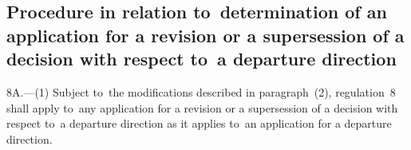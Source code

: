 \documentclass[12pt,a4paper]{article}
\begin{document}


\subsection[8A. Procedure in relation to~determination of an application for a revision or a supersession of a decision with respect to~a departure direction]{Procedure in relation to~determination of an application for a revision or a supersession of a decision with respect to~a departure direction}

8A.—(1) Subject to~the modifications described in paragraph~(2), regulation~8 shall apply to~any application for a revision or a supersession of a decision with respect to~a departure direction as it applies to~an application for a departure direction.
\end{document}
